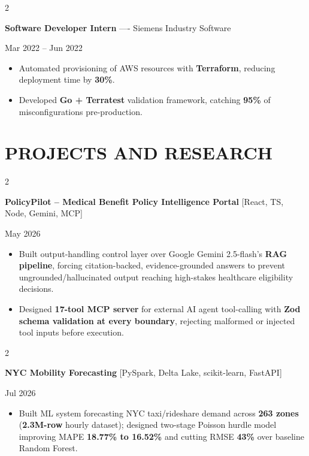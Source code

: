 \documentclass[10pt, letterpaper]{article}
\newenvironment{highlights}{
    \begin{itemize}[
        topsep=0.10 cm,
        parsep=0.06 cm,
        partopsep=0pt,
        itemsep=0.06 cm,
        leftmargin=12pt
    ]
}{
    \end{itemize}
}
\newenvironment{twocolentry}[2][]{
    \onecolentry
    \def\secondColumn{#2}
    \setcolumnwidth{\fill, 4.5 cm}
    \begin{paracol}{2}
}{
    \switchcolumn \raggedleft \secondColumn
    \end{paracol}
    \endonecolentry
}
\begin{document}
\vspace{0.15 cm}

\begin{twocolentry}{Mar 2022 -- Jun 2022}
\textbf{Software Developer Intern} ---- Siemens Industry Software
\end{twocolentry}
\begin{highlights}
  \item Automated provisioning of AWS resources with \textbf{Terraform}, reducing deployment time by \textbf{30\%}.
  \item Developed \textbf{Go + Terratest} validation framework, catching \textbf{95\%} of misconfigurations pre-production.
\end{highlights}

\section{PROJECTS AND RESEARCH}
\begin{twocolentry}{May 2026}
\textbf{PolicyPilot -- Medical Benefit Policy Intelligence Portal} [React, TS, Node, Gemini, MCP]
\end{twocolentry}
\begin{highlights}
  \item Built output-handling control layer over Google Gemini 2.5-flash's \textbf{RAG pipeline}, forcing citation-backed, evidence-grounded answers to prevent ungrounded/hallucinated output reaching high-stakes healthcare eligibility decisions.
  \item Designed \textbf{17-tool MCP server} for external AI agent tool-calling with \textbf{Zod schema validation at every boundary}, rejecting malformed or injected tool inputs before execution.
\end{highlights}

\vspace{0.12 cm}

\begin{twocolentry}{Jul 2026}
\textbf{NYC Mobility Forecasting} [PySpark, Delta Lake, scikit-learn, FastAPI]
\end{twocolentry}
\begin{highlights}
  \item Built ML system forecasting NYC taxi/rideshare demand across \textbf{263 zones} (\textbf{2.3M-row} hourly dataset); designed two-stage Poisson hurdle model improving MAPE \textbf{18.77\% to 16.52\%} and cutting RMSE \textbf{43\%} over baseline Random Forest.
\end{highlights}
\end{document}
